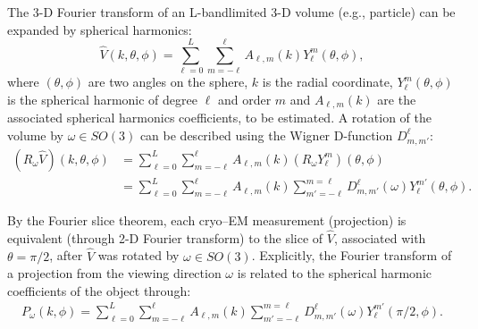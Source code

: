 \documentclass[english,11pt]{article}
\newcommand{\1}{\mathbf{1}}
\numberwithin{equation}{section}
\theoremstyle{plain}
\theoremstyle{definition}
\theoremstyle{remark}
\theoremstyle{plain}
\theoremstyle{remark}
\theoremstyle{plain}
\theoremstyle{plain}
\begin{document}
The 3-D Fourier transform of an L-bandlimited 3-D volume (e.g., particle) can be expanded by  spherical harmonics:
\begin{equation} \label{eq:volume}
\hat{V}(k,\theta,\phi)  = \sum_{\ell=0}^{L} \sum_{m=-\ell}^{\ell} A_{\ell,m}(k)Y_\ell^{m}(\theta,\phi),
\end{equation}
where $(\theta,\phi)$ are two angles on the sphere, $k$ is the radial coordinate, $Y_{\ell}^m(\theta,\phi)$ is the spherical harmonic of degree $\ell$ and order $m$ and  $A_{\ell,m}(k)$ are the associated spherical harmonics coefficients, to be estimated. 
A rotation of the volume by $\omega\in SO(3)$ can be described using the Wigner D-function $D_{m,m'}^{\ell}$:
\begin{equation}
\begin{split}
(R_\omega \hat{V})(k,\theta,\phi)  &= \sum_{\ell=0}^{L} \sum_{m=-\ell}^{\ell} A_{\ell,m}(k)(R_\omega Y_\ell^{m})(\theta,\phi) \\
&= \sum_{\ell=0}^{L} \sum_{m=-\ell}^{\ell} A_{\ell,m}(k) 
\sum_{m'=-\ell}^{m=\ell}{D_{m,m'}^{\ell}(\omega)}Y_\ell^{m'}(\theta,\phi).
\end{split}
\end{equation}

By the Fourier slice theorem, each cryo--EM measurement (projection) is equivalent (through 2-D Fourier transform) to the slice of $\hat{V}$, associated with $\theta= \pi/2$, after $\hat{V}$ was rotated by $\omega\in SO(3)$. Explicitly, the Fourier transform of a projection from the viewing direction $\omega$ is related to the spherical harmonic coefficients of the object through:
\begin{equation} \label{eq:P}
\begin{split}
P_\omega(k,\phi)  = \sum_{\ell=0}^{L} \sum_{m=-\ell}^{\ell} A_{\ell,m}(k) 
\sum_{m'=-\ell}^{m=\ell}{D_{m,m'}^{\ell}(\omega)}Y_\ell^{m'}(\pi/2,\phi).
\end{split}
\end{equation}
\end{document}

